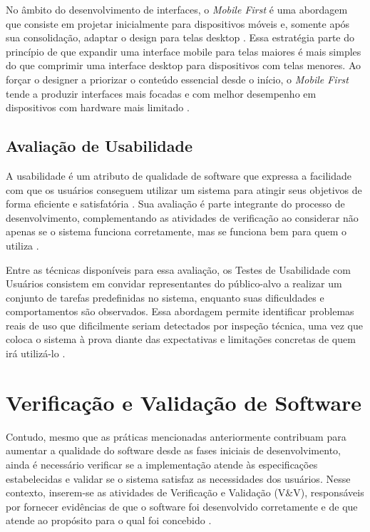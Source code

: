 No âmbito do desenvolvimento de interfaces, o \textit{Mobile First} é uma abordagem que consiste em projetar inicialmente para dispositivos móveis e, somente após sua consolidação, adaptar o design para telas desktop \cite{wroblewski2011}. Essa estratégia parte do princípio de que expandir uma interface mobile para telas maiores é mais simples do que comprimir uma interface desktop para dispositivos com telas menores. Ao forçar o designer a priorizar o conteúdo essencial desde o início, o \textit{Mobile First} tende a produzir interfaces mais focadas e com melhor desempenho em dispositivos com hardware mais limitado \cite{hernandeznieto2015mobile}.
 
\subsection{Avaliação de Usabilidade}
 
A usabilidade é um atributo de qualidade de software que expressa a facilidade com que os usuários conseguem utilizar um sistema para atingir seus objetivos de forma eficiente e satisfatória \cite{ iso9241_2018}. Sua avaliação é parte integrante do processo de desenvolvimento, complementando as atividades de verificação ao considerar não apenas se o sistema funciona corretamente, mas se funciona bem para quem o utiliza \cite{sommerville2019}.
 
Entre as técnicas disponíveis para essa avaliação, os Testes de Usabilidade com Usuários consistem em convidar representantes do público-alvo a realizar um conjunto de tarefas predefinidas no sistema, enquanto suas dificuldades e comportamentos são observados. Essa abordagem permite identificar problemas reais de uso que dificilmente seriam detectados por inspeção técnica, uma vez que coloca o sistema à prova diante das expectativas e limitações concretas de quem irá utilizá-lo \cite{nielsen1993, rubin2008handbook}.
 
\section{Verificação e Validação de Software}\label{sec:vv}

Contudo, mesmo que as práticas mencionadas anteriormente contribuam para aumentar a qualidade do software desde as fases iniciais de desenvolvimento, ainda é necessário verificar se a implementação atende às especificações estabelecidas e validar se o sistema satisfaz as necessidades dos usuários. Nesse contexto, inserem-se as atividades de Verificação e Validação (V\&V), responsáveis por fornecer evidências de que o software foi desenvolvido corretamente e de que atende ao propósito para o qual foi concebido \cite{iso29119_2022}. %

